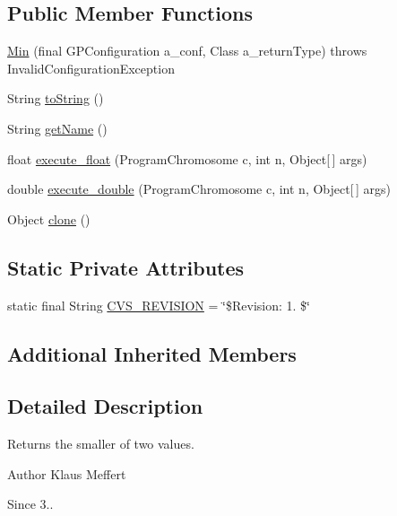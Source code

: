 \subsection*{Public Member Functions}
\begin{DoxyCompactItemize}
\item 
\hyperlink{classorg_1_1jgap_1_1gp_1_1function_1_1_min_afef48d927ca8add466726f98bff02607}{Min} (final G\-P\-Configuration a\-\_\-conf, Class a\-\_\-return\-Type)  throws Invalid\-Configuration\-Exception 
\item 
String \hyperlink{classorg_1_1jgap_1_1gp_1_1function_1_1_min_ab157ef2a0782ee0999de6fce7284d600}{to\-String} ()
\item 
String \hyperlink{classorg_1_1jgap_1_1gp_1_1function_1_1_min_a38cbb7c788e1eb8a36e9cadc5a7b2f02}{get\-Name} ()
\item 
float \hyperlink{classorg_1_1jgap_1_1gp_1_1function_1_1_min_ab8b42848118a49e44a1f7beea1acbf56}{execute\-\_\-float} (Program\-Chromosome c, int n, Object\mbox{[}$\,$\mbox{]} args)
\item 
double \hyperlink{classorg_1_1jgap_1_1gp_1_1function_1_1_min_a212841136279ceac77ddcf185b6b60ba}{execute\-\_\-double} (Program\-Chromosome c, int n, Object\mbox{[}$\,$\mbox{]} args)
\item 
Object \hyperlink{classorg_1_1jgap_1_1gp_1_1function_1_1_min_a2c23cba28c948657cc979ff887338022}{clone} ()
\end{DoxyCompactItemize}
\subsection*{Static Private Attributes}
\begin{DoxyCompactItemize}
\item 
static final String \hyperlink{classorg_1_1jgap_1_1gp_1_1function_1_1_min_a0d1231bb17c03c5c942081d4e50171d8}{C\-V\-S\-\_\-\-R\-E\-V\-I\-S\-I\-O\-N} = \char`\"{}\$Revision\-: 1. \$\char`\"{}
\end{DoxyCompactItemize}
\subsection*{Additional Inherited Members}


\subsection{Detailed Description}
Returns the smaller of two values.

\begin{DoxyAuthor}{Author}
Klaus Meffert 
\end{DoxyAuthor}
\begin{DoxySince}{Since}
3.. 
\end{DoxySince}


